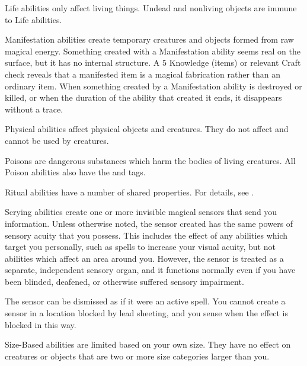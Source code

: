    Life abilities only affect living things.
  Undead and nonliving objects are immune to Life abilities.

   Manifestation abilities create temporary creatures and objects formed from raw magical energy.
  Something created with a Manifestation ability seems real on the surface, but it has no internal structure.
  A  5 Knowledge (items) or relevant Craft check reveals that a manifested item is a magical fabrication rather than an ordinary item.
  When something created by a Manifestation ability is destroyed or killed, or when the duration of the ability that created it ends, it disappears without a trace.

   Physical abilities affect physical objects and creatures.
  They do not affect and cannot be used by  creatures.

   Poisons are dangerous substances which harm the bodies of living creatures.
  All Poison abilities also have the \atLife and \atPhysical tags.

   Ritual abilities have a number of shared properties.
  For details, see .

   Scrying abilities create one or more invisible magical sensors that send you information.
  Unless otherwise noted, the sensor created has the same powers of sensory acuity that you possess.
  This includes the effect of any abilities which target you personally, such as spells to increase your visual acuity, but not abilities which affect an area around you.
  However, the sensor is treated as a separate, independent sensory organ, and it functions normally even if you have been blinded, deafened, or otherwise suffered sensory impairment.
  \par The sensor can be dismissed as if it were an active spell.
  You cannot create a sensor in a location blocked by lead sheeting, and you sense when the effect is blocked in this way.

   Size-Based abilities are limited based on your own size.
  They have no effect on creatures or objects that are two or more size categories larger than you.

